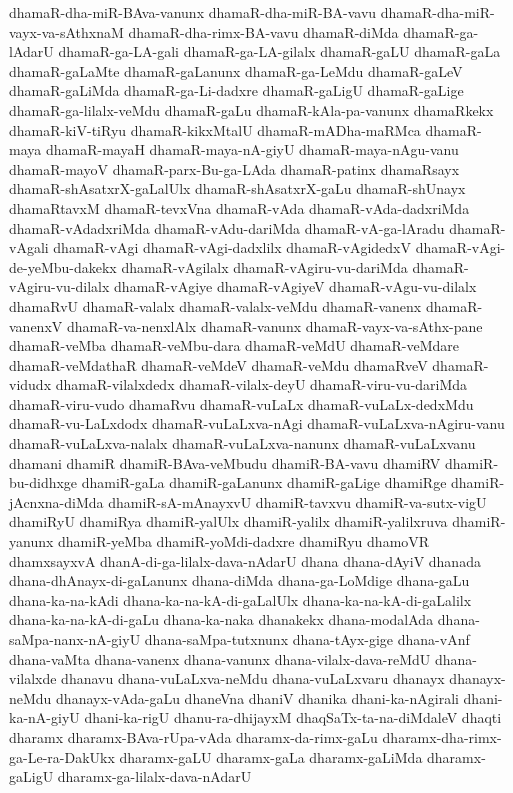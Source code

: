 {dhamaR-dha-miR-BAva-vanunx
dhamaR-dha-miR-BA-vavu
dhamaR-dha-miR-vayx-va-sAthxnaM
dhamaR-dha-rimx-BA-vavu
dhamaR-diMda
dhamaR-ga-lAdarU
dhamaR-ga-LA-gali
dhamaR-ga-LA-gilalx
dhamaR-gaLU
dhamaR-gaLa
dhamaR-gaLaMte
dhamaR-gaLanunx
dhamaR-ga-LeMdu
dhamaR-gaLeV
dhamaR-gaLiMda
dhamaR-ga-Li-dadxre
dhamaR-gaLigU
dhamaR-gaLige
dhamaR-ga-lilalx-veMdu
dhamaR-gaLu
dhamaR-kAla-pa-vanunx
dhamaRkekx
dhamaR-kiV-tiRyu
dhamaR-kikxMtalU
dhamaR-mADha-maRMca
dhamaR-maya
dhamaR-mayaH
dhamaR-maya-nA-giyU
dhamaR-maya-nAgu-vanu
dhamaR-mayoV
dhamaR-parx-Bu-ga-LAda
dhamaR-patinx
dhamaRsayx
dhamaR-shAsatxrX-gaLalUlx
dhamaR-shAsatxrX-gaLu
dhamaR-shUnayx
dhamaRtavxM
dhamaR-tevxVna
dhamaR-vAda
dhamaR-vAda-dadxriMda
dhamaR-vAdadxriMda
dhamaR-vAdu-dariMda
dhamaR-vA-ga-lAradu
dhamaR-vAgali
dhamaR-vAgi
dhamaR-vAgi-dadxlilx
dhamaR-vAgidedxV
dhamaR-vAgi-de-yeMbu-dakekx
dhamaR-vAgilalx
dhamaR-vAgiru-vu-dariMda
dhamaR-vAgiru-vu-dilalx
dhamaR-vAgiye
dhamaR-vAgiyeV
dhamaR-vAgu-vu-dilalx
dhamaRvU
dhamaR-valalx
dhamaR-valalx-veMdu
dhamaR-vanenx
dhamaR-vanenxV
dhamaR-va-nenxlAlx
dhamaR-vanunx
dhamaR-vayx-va-sAthx-pane
dhamaR-veMba
dhamaR-veMbu-dara
dhamaR-veMdU
dhamaR-veMdare
dhamaR-veMdathaR
dhamaR-veMdeV
dhamaR-veMdu
dhamaRveV
dhamaR-vidudx
dhamaR-vilalxdedx
dhamaR-vilalx-deyU
dhamaR-viru-vu-dariMda
dhamaR-viru-vudo
dhamaRvu
dhamaR-vuLaLx
dhamaR-vuLaLx-dedxMdu
dhamaR-vu-LaLxdodx
dhamaR-vuLaLxva-nAgi
dhamaR-vuLaLxva-nAgiru-vanu
dhamaR-vuLaLxva-nalalx
dhamaR-vuLaLxva-nanunx
dhamaR-vuLaLxvanu
dhamani
dhamiR
dhamiR-BAva-veMbudu
dhamiR-BA-vavu
dhamiRV
dhamiR-bu-didhxge
dhamiR-gaLa
dhamiR-gaLanunx
dhamiR-gaLige
dhamiRge
dhamiR-jAcnxna-diMda
dhamiR-sA-mAnayxvU
dhamiR-tavxvu
dhamiR-va-sutx-vigU
dhamiRyU
dhamiRya
dhamiR-yalUlx
dhamiR-yalilx
dhamiR-yalilxruva
dhamiR-yanunx
dhamiR-yeMba
dhamiR-yoMdi-dadxre
dhamiRyu
dhamoVR
dhamxsayxvA
dhanA-di-ga-lilalx-dava-nAdarU
dhana
dhana-dAyiV
dhanada
dhana-dhAnayx-di-gaLanunx
dhana-diMda
dhana-ga-LoMdige
dhana-gaLu
dhana-ka-na-kAdi
dhana-ka-na-kA-di-gaLalUlx
dhana-ka-na-kA-di-gaLalilx
dhana-ka-na-kA-di-gaLu
dhana-ka-naka
dhanakekx
dhana-modalAda
dhana-saMpa-nanx-nA-giyU
dhana-saMpa-tutxnunx
dhana-tAyx-gige
dhana-vAnf
dhana-vaMta
dhana-vanenx
dhana-vanunx
dhana-vilalx-dava-reMdU
dhana-vilalxde
dhanavu
dhana-vuLaLxva-neMdu
dhana-vuLaLxvaru
dhanayx
dhanayx-neMdu
dhanayx-vAda-gaLu
dhaneVna
dhaniV
dhanika
dhani-ka-nAgirali
dhani-ka-nA-giyU
dhani-ka-rigU
dhanu-ra-dhijayxM
dhaqSaTx-ta-na-diMdaleV
dhaqti
dharamx
dharamx-BAva-rUpa-vAda
dharamx-da-rimx-gaLu
dharamx-dha-rimx-ga-Le-ra-DakUkx
dharamx-gaLU
dharamx-gaLa
dharamx-gaLiMda
dharamx-gaLigU
dharamx-ga-lilalx-dava-nAdarU
}
